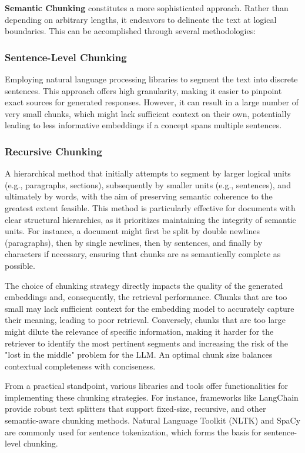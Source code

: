 \textbf{Semantic Chunking} constitutes a more sophisticated approach. Rather than depending on arbitrary lengths, it endeavors to delineate the text at logical boundaries. This can be accomplished through several methodologies:

\subsubsection{Sentence-Level Chunking}
Employing natural language processing libraries to segment the text into discrete sentences. This approach offers high granularity, making it easier to pinpoint exact sources for generated responses. However, it can result in a large number of very small chunks, which might lack sufficient context on their own, potentially leading to less informative embeddings if a concept spans multiple sentences.

\subsubsection{Recursive Chunking}
A hierarchical method that initially attempts to segment by larger logical units (e.g., paragraphs, sections), subsequently by smaller units (e.g., sentences), and ultimately by words, with the aim of preserving semantic coherence to the greatest extent feasible. This method is particularly effective for documents with clear structural hierarchies, as it prioritizes maintaining the integrity of semantic units. For instance, a document might first be split by double newlines (paragraphs), then by single newlines, then by sentences, and finally by characters if necessary, ensuring that chunks are as semantically complete as possible.

The choice of chunking strategy directly impacts the quality of the generated embeddings and, consequently, the retrieval performance. Chunks that are too small may lack sufficient context for the embedding model to accurately capture their meaning, leading to poor retrieval. Conversely, chunks that are too large might dilute the relevance of specific information, making it harder for the retriever to identify the most pertinent segments and increasing the risk of the "lost in the middle" problem for the LLM. An optimal chunk size balances contextual completeness with conciseness.

From a practical standpoint, various libraries and tools offer functionalities for implementing these chunking strategies. For instance, frameworks like LangChain \autocite{langchain} provide robust text splitters that support fixed-size, recursive, and other semantic-aware chunking methods. Natural Language Toolkit (NLTK) \autocite{loper2002nltknaturallanguagetoolkit} and SpaCy \autocite{honnibal2020spacy} are commonly used for sentence tokenization, which forms the basis for sentence-level chunking.

